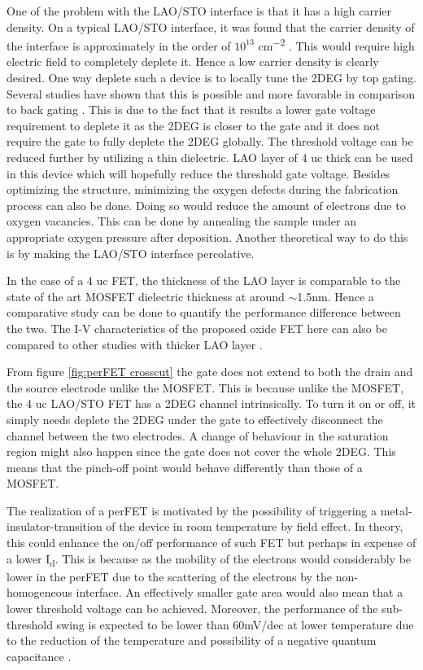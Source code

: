 \documentclass[11pt,a4paper]{report}
\begin{document}
One of the problem with the LAO/STO interface is that it has a high carrier density. On a typical LAO/STO interface, it was found that the carrier density of the interface is approximately in the order of $10^{13}$ \si{cm^{-2}} \cite{thiel_2006}. This would require high electric field to completely deplete it. Hence a low carrier density is clearly desired. One way deplete such a device is to locally tune the 2DEG by top gating. Several studies have shown that this is possible and more favorable in comparison to back gating \cite{forg_richter_mannhart_2012,caviglia}. This is due to the fact that it results a lower gate voltage requirement to deplete it as the 2DEG is closer to the gate and it does not require the gate to fully deplete the 2DEG globally. The threshold voltage can be reduced further by utilizing a thin dielectric. LAO layer of 4 uc thick can be used in this device which will hopefully reduce the threshold gate voltage. Besides optimizing the structure, minimizing the oxygen defects during the fabrication process can also be done. Doing so would reduce the amount of electrons due to oxygen vacancies. This can be done by annealing the sample under an appropriate oxygen pressure after deposition. Another theoretical way to do this is by making the LAO/STO interface percolative. 

In the case of a 4 uc FET, the thickness of the LAO layer is comparable to the state of the art MOSFET dielectric thickness at around $\sim$1.5\si{nm}. Hence a comparative study can be done to quantify the performance difference between the two. The I-V characteristics of the proposed oxide FET here can also be compared to other studies with thicker LAO layer \cite{eerkes_wiel_hilgenkamp_2013, hosoda_hikita_hwang_bell_2013, forg_richter_mannhart_2012}. 

From figure \ref{fig:perFET crosscut} the gate does not extend to both the drain and the source electrode unlike the MOSFET. This is because unlike the MOSFET, the 4 uc LAO/STO FET has a 2DEG channel intrinsically. To turn it on or off, it simply needs deplete the 2DEG under the gate to effectively disconnect the channel between the two electrodes. A change of behaviour in the saturation region might also happen since the gate does not cover the whole 2DEG. This means that the pinch-off point would behave differently than those of a MOSFET.

The realization of a perFET is motivated by the possibility of triggering a metal-insulator-transition of the device in room temperature by field effect. In theory, this could enhance the on/off performance of such FET but perhaps in expense of a lower I\textsubscript{d}. This is because as the mobility of the electrons would considerably be lower in the perFET due to the scattering of the electrons by the non-homogeneous interface. An effectively smaller gate area would also mean that a lower threshold voltage can be achieved. Moreover, the performance of the sub-threshold swing is expected to be lower than 60mV/dec at lower temperature due to the reduction of the temperature and possibility of a negative quantum capacitance \cite{li_Large_capacitance_enhancement_2011}.
\end{document}
